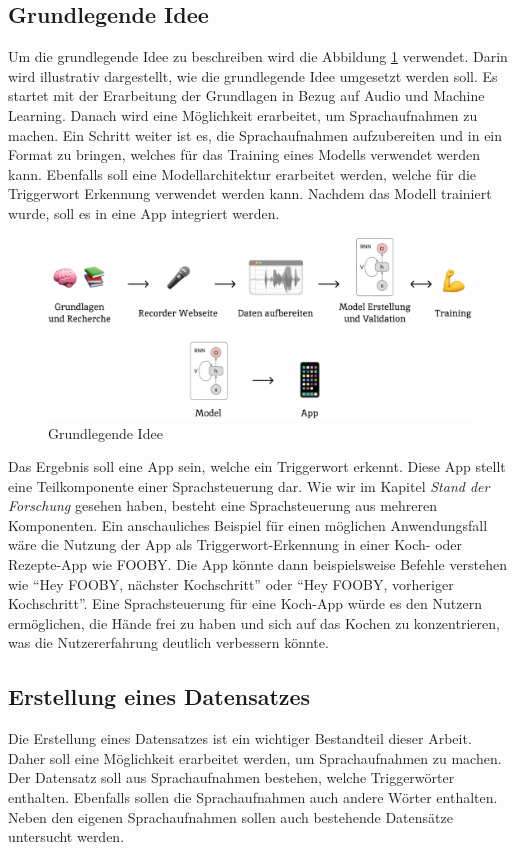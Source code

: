 \documentclass[11pt,a4paper]{article}
\begin{document}
\subsection{Grundlegende Idee}
Um die grundlegende Idee zu beschreiben wird die Abbildung \ref{fig:basic_idea} verwendet. Darin 
wird illustrativ dargestellt, wie die grundlegende Idee umgesetzt werden soll. Es startet mit der
Erarbeitung der Grundlagen in Bezug auf Audio und Machine Learning. Danach wird eine Möglichkeit
erarbeitet, um Sprachaufnahmen zu machen. Ein Schritt weiter ist es, die Sprachaufnahmen
aufzubereiten und in ein Format zu bringen, welches für das Training eines Modells verwendet werden
kann. Ebenfalls soll eine Modellarchitektur erarbeitet werden, welche für die Triggerwort Erkennung
verwendet werden kann. Nachdem das Modell trainiert wurde, soll es in eine App integriert werden.

\begin{figure}[h]
	\centering
	\includegraphics[width=0.85\linewidth]{img/basic_idea.pdf}
	\caption{Grundlegende Idee}
	\label{fig:basic_idea}
\end{figure}

\noindent \newline
Das Ergebnis soll eine App sein, welche ein Triggerwort erkennt. Diese App stellt eine 
Teilkomponente einer Sprachsteuerung dar. Wie wir im Kapitel \textit{Stand der Forschung} gesehen 
haben, besteht eine Sprachsteuerung aus mehreren Komponenten. Ein anschauliches Beispiel für einen 
möglichen Anwendungsfall wäre die Nutzung der App als Triggerwort-Erkennung in einer Koch- oder 
Rezepte-App wie FOOBY. Die App könnte dann beispielsweise Befehle verstehen wie ``Hey FOOBY, 
nächster Kochschritt'' oder ``Hey FOOBY, vorheriger Kochschritt''. Eine Sprachsteuerung für 
eine Koch-App würde es den Nutzern ermöglichen, die Hände frei zu haben und sich auf das Kochen zu 
konzentrieren, was die Nutzererfahrung deutlich verbessern könnte.

\subsection{Erstellung eines Datensatzes}
Die Erstellung eines Datensatzes ist ein wichtiger Bestandteil dieser Arbeit. Daher soll eine 
Möglichkeit erarbeitet werden, um Sprachaufnahmen zu machen. Der Datensatz soll aus Sprachaufnahmen
bestehen, welche Triggerwörter enthalten. Ebenfalls sollen die Sprachaufnahmen auch andere Wörter
enthalten. Neben den eigenen Sprachaufnahmen sollen auch bestehende Datensätze untersucht werden.
\end{document}
